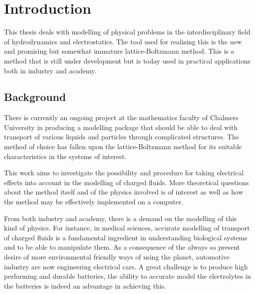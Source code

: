 \chapter{Introduction}
This thesis deals with modelling of physical problems in the
interdisciplinary field of hydrodynamics and electrostatics. The tool
used for realising this is the new and promising but somewhat immature
lattice-Boltzmann method. This is a method that is still under
development but is today used in practical applications both in
industry and academy.

\section{Background}

There is currently an ongoing project at the mathematics faculty of
Chalmers University in producing a modelling package that
should be able to deal with transport of various liquids and particles
through complicated structures. The method of choice has fallen upon
the lattice-Boltzmann method for its suitable characteristics in the
systems of interest. 

This work aims to investigate the possibility and procedure for taking
electrical effects into account in the modelling of charged
fluids. More theoretical questions about the method itself and of the
physics involved is of interest as well as how the method may be
effectively implemented on a computer.

From both industry and academy, there is a demand on the modelling of
this kind of physics. For instance, in medical sciences, accurate
modelling of transport of charged fluids is a fundamental ingredient
in understanding biological systems and to be able to manipulate
them. As a consequence of the always so present desire of more
environmental friendly ways of using the planet, automotive industry
are now engineering electrical cars. A great challenge is to produce
high performing and durable batteries, the ability to accurate
model the electrolytes in the batteries is indeed an advantage in
achieving this. 

